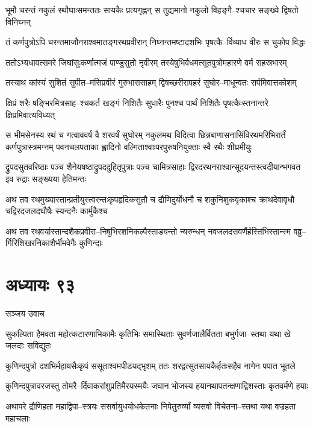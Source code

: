 \twolineshloka
{भूमौ चरन्तं नकुलं रथौघाःसमन्ततः सायकैः प्रत्यगृह्णन्}
{स तुद्यमानो नकुलो विहङ्गै--श्चचार सङ्ख्ये द्विषतो विनिघ्नन्}


\twolineshloka
{तं कर्णपुत्रोऽपि चरन्तमाजौनराश्वमातङ्गरथप्रवीरान्}
{निघ्नन्तमष्टादशभिः पृषत्कै--र्विव्याध वीरः स चुकोप विद्धः}


\twolineshloka
{ततोऽभ्यधावत्समरे जिघांसुःकर्णात्मजं पाण्डुसुतो नृवीरम्}
{तस्येषुभिर्वधमत्सूतपुत्रोमहारणे वर्म सहस्रभारम्}


\twolineshloka
{तस्याथ कांस्यं सुशितं सुपीत--मसिप्रवीरं गुरुभारासाहम्}
{द्विषच्छरीरापहरं सुघोर--माधून्वतः सर्पमिवात्तकोशम्}


\twolineshloka
{क्षिप्रं शरैः षङ्भिरमित्रसाह--श्चकर्त खङ्गं निशितैः सुधारैः}
{पुनश्च पार्थं निशितैः पृषत्कैःस्तनान्तरे क्षिप्रमिवात्यविध्यत्}


स भीमसेनस्य रथं च गत्वाववर्ष वै शरवर्षं सुघोरम्
\twolineshloka
{नकुलमथ विदित्वा छिन्नबाणासनासिंविरथमरिभिरार्तं कर्णपुत्रास्त्रमग्नम्}
{पवनचलपताका ह्लादिनो वल्गिताश्वाःपरपुरुषनियुक्ताः स्वै रथैः शीघ्रमीयुः}


\twolineshloka
{द्रुपदसुतवरिष्ठाः पञ्च शैनेयषष्ठाद्रुपददुहितृपुत्राः पञ्च चामित्रसाहाः}
{द्विरदरथनराश्वान्सूदयन्तस्त्वदीयान्भगवत इव रुद्राः सङ्ख्यया हेतिमन्तः}


\twolineshloka
{अथ तव रथमुख्यास्तान्प्रतीयुस्त्वरन्तःकृपहृदिकसुतौ च द्रौणिदुर्योधनौ च}
{शकुनिशुकवृकाश्च क्राथदेवावृधौ चद्विरदजलदघौषैः स्यन्दनैः कार्मुकैश्च}


\twolineshloka
{अथ तव रथवर्यास्तान्दशैकप्रवीरा--निषुभिरशनिकल्पैस्ताडयन्तो न्यरुन्धन्}
{नवजलदसवर्णैर्हस्तिभिस्तान्स्म वव्रु--र्गिरिशिखरनिकाशैर्भीमवेगैः कुणिन्दाः}


\chapter{अध्यायः ९३}
\twolineshloka
{सञ्जय उवाच}
{}


\twolineshloka
{सुकल्पिता हैमवता महोत्कटारणाभिकामैः कृतिभिः समास्थिताः}
{सुवर्णजालैर्वितता बभुर्गजा--स्तथा यथा खे जलदाः सविद्युतः}


\twolineshloka
{कुणिन्दपुत्रो दशभिर्महायसैःकृपं ससूताश्वमपीडयद्भृशम्}
{ततः शरद्वत्सुतसायकैर्हतःसहैव नागेन पपात भूतले}


\twolineshloka
{कुणिन्दपुत्रावरजस्तु तोमरै--र्दिवाकरांशुप्रतिमैरयस्मयैः}
{जघान भोजस्य हयानथापतन्क्षणाद्विशस्ताः कृतवर्मणे हयाः}


\twolineshloka
{अथापरे द्रौणिहता महाद्विपा--स्त्रयः ससर्वायुधयोधकेतनाः}
{निपेतुरुर्व्यां व्यसवो विचेतना--स्तथा यथा वज्रहता महाचलाः}


